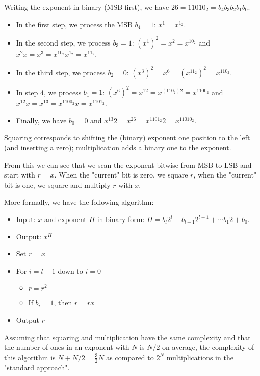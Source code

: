 Writing the exponent in binary (MSB-first), we have $26 = 11010_2 = b_4 b_3 b_2 b_1 b_0$. 

\begin{itemize}
	\item In the first step, we process the MSB $b_4 = 1$: $x^1 = x^{1_2}$.
	\item In the second step, we process $b_3 = 1$: $(x^1)^2 = x^2 = x^{10_2}$ and $x^2 x = x^3 = x^{10_2} x^{1_2} = x^{11_2}$.
	\item In the third step, we process $b_2 = 0$: $(x^3)^2 = x^6 = (x^{11_2})^2 = x^{110_2}$.
	\item In step 4, we process $b_1 = 1$: $(x^6)^2 = x^{12} = x^{(110_2)2} = x^{1100_2}$ and $x^{12} x = x^{13} = x^{1100_2}x = x^{1101_2}$.
	\item Finally, we have $b_0 = 0$ and $x^{13}2 = x^{26} = x^{1101_2}2 = x^{11010_2}$.
\end{itemize}

Squaring corresponds to shifting the (binary) exponent one position to the left (and inserting a zero); multiplication adds a binary one to the exponent.

From this we can see that we scan the exponent bitwise from MSB to LSB and start with $r = x$. When the "current" bit is zero, we square $r$, when the "current" bit is one, we square and multiply $r$ with $x$.

More formally, we have the following algorithm:

\begin{itemize}
	\item Input: $x$ and exponent $H$ in binary form: $H = b_l 2^l + b_{l-1} 2^{l-1} + \cdots b_1 2 + b_0$.
	\item Output: $x^H$
	\item Set $r = x$
	\item For $i=l-1$ down-to $i=0$
	\begin{itemize}
		\item $r = r^2$
		\item If $b_i=1$, then $r = r x$
	\end{itemize}
	\item Output $r$
\end{itemize}

Assuming that squaring and multiplication have the same complexity and that the number of ones in an exponent with $N$ is $N/2$ on average, the complexity of this algorithm is $N + N/2 = \frac{3}{2}N$ as compared to $2^N$ multiplications in the "standard approach".

